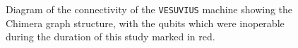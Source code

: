 \begin{figure}
	\caption[\texttt{VESUVIUS} Layout]{Diagram of the connectivity of the \texttt{VESUVIUS} machine showing the Chimera graph structure, with the qubits which were inoperable during the duration of this study marked in red.}
	\label{fig:broken_qubits}
\end{figure}
